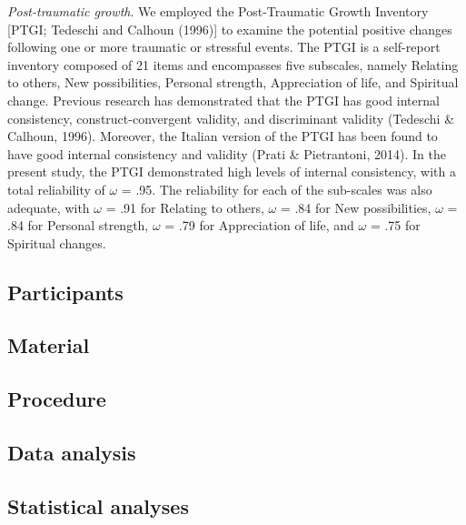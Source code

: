 \documentclass[
  man]{apa6}
\begin{document}
\emph{Post-traumatic growth}. We employed the Post-Traumatic Growth Inventory {[}PTGI; Tedeschi and Calhoun (1996){]} to examine the potential positive changes following one or more traumatic or stressful events. The PTGI is a self-report inventory composed of 21 items and encompasses five subscales, namely Relating to others, New possibilities, Personal strength, Appreciation of life, and Spiritual change. Previous research has demonstrated that the PTGI has good internal consistency, construct-convergent validity, and discriminant validity (Tedeschi \& Calhoun, 1996). Moreover, the Italian version of the PTGI has been found to have good internal consistency and validity (Prati \& Pietrantoni, 2014). In the present study, the PTGI demonstrated high levels of internal consistency, with a total reliability of \(\omega\) = .95. The reliability for each of the sub-scales was also adequate, with \(\omega\) = .91 for Relating to others, \(\omega\) = .84 for New possibilities, \(\omega\) = .84 for Personal strength, \(\omega\) = .79 for Appreciation of life, and \(\omega\) = .75 for Spiritual changes.

\hypertarget{participants}{%
\subsection{Participants}\label{participants}}

\hypertarget{material}{%
\subsection{Material}\label{material}}

\hypertarget{procedure}{%
\subsection{Procedure}\label{procedure}}

\hypertarget{data-analysis}{%
\subsection{Data analysis}\label{data-analysis}}

\hypertarget{statistical-analyses}{%
\subsection{Statistical analyses}\label{statistical-analyses}}
\end{document}
